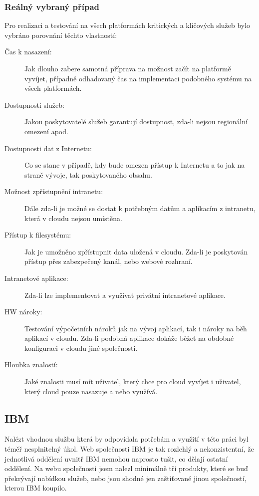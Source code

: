 \subsubsection{Reálný vybraný případ}
Pro realizaci a testování na všech platformách kritických a klíčových služeb bylo vybráno porovnání těchto vlastností:
\begin{description}
	\item [Čas k nasazení:] Jak dlouho zabere samotná příprava na možnost začít na platformě vyvíjet, případně odhadovaný čas na implementaci podobného systému na všech platformách.
	\item [Dostupnosti služeb:] Jakou poskytovatelé služeb garantují dostupnost, zda-li nejsou regionální omezení apod.
	\item [Dostupnosti dat z Internetu:] Co se stane v případě, kdy bude omezen přístup k Internetu a to jak na straně vývoje, tak poskytovaného obsahu.
	\item [Možnost zpřístupnění intranetu:] Dále zda-li je možné se dostat k potřebným datům a aplikacím z intranetu, která v cloudu nejsou umístěna.
	\item [Přístup k filesystému:] Jak je umožněno zpřístupnit data uložená v cloudu. Zda-li je poskytován přístup přes zabezpečený kanál, nebo webové rozhraní.
	\item [Intranetové aplikace:] Zda-li lze implementovat a využívat privátní intranetové aplikace.
	\item [HW nároky:] Testování výpočetních nároků jak na vývoj aplikací, tak i nároky na běh aplikací v cloudu. Zda-li podobná aplikace dokáže běžet na obdobné konfiguraci v cloudu jiné společnosti.
	\item [Hloubka znalostí:] Jaké znalosti musí mít uživatel, který chce pro cloud vyvíjet i uživatel, který cloud pouze nasazuje a nebo využívá.
\end{description}

\subsection{IBM}
Nalézt vhodnou službu která by odpovídala potřebám a využití v této práci byl téměř nesplnitelný úkol. Web společnosti IBM je tak rozlehlý a nekonzistentní, že jednotlivá oddělení uvnitř IBM nemohou naprosto tušit, co dělají ostatní oddělení. Na webu společnosti jsem nalezl minimálně tři produkty, které se buď překrývají nabídkou služeb, nebo jsou shodné jen zaštiťované jinou společností, kterou IBM koupilo.

